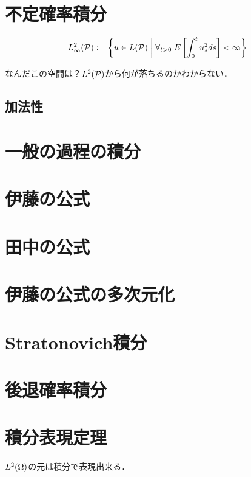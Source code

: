 \documentclass[uplatex,dvipdfmx]{jsreport}
\begin{document}
\section{不定確率積分}

\begin{notation}
    \[L^2_\infty(\P):=\Brace{u\in L(\P)\;\middle|\;\forall_{t>0}\;E\Square{\int^t_0u_s^2ds}<\infty}\]
\end{notation}

なんだこの空間は？$L^2(\P)$から何が落ちるのかわからない．

\subsection{加法性}

\section{一般の過程の積分}

\section{伊藤の公式}

\section{田中の公式}

\section{伊藤の公式の多次元化}

\section{Stratonovich積分}

\section{後退確率積分}

\section{積分表現定理}

\begin{tcolorbox}[colframe=ForestGreen, colback=ForestGreen!10!white,breakable,colbacktitle=ForestGreen!40!white,coltitle=black,fonttitle=\bfseries\sffamily,
title=]
    $L^2(\Om)$の元は積分で表現出来る．
\end{tcolorbox}
\end{document}
